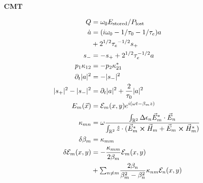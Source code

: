 \documentclass[12pt]{article}
\begin{document}
\begin{multicols}{2}
\textbf{CMT}

\begin{align}
  Q &= \omega_0 E_{\textrm{stored}}/P_{\textrm{lost}}\\
  \dot{a} &= (i\omega_0 - 1/\tau_0 - 1/\tau_e) a\\
  &+ 2^{1/2} {\tau_e}^{-1/2}s_+\\
  s_- &= -s_+ + 2^{1/2} \tau_e^{-1/2} a\\
  p_1 \kappa_{12} &= -p_2 \kappa_{21}^{*}\\
  \partial_t \lvert a \rvert^2 &= - \lvert s_- \rvert^2\\
  \lvert s_+ \rvert^2  - \lvert s_- \rvert^2 &= \partial_t \lvert a \rvert^2 + \frac{2}{\tau_0} \lvert a \rvert^2\\
  E_{m}(\vec{x}) &= \mathcal{E}_m(x, y)e^{i(\omega t - \beta_m z)}\\ %
  \kappa_{mn} &= \omega \frac{\int_{\mathbb{R}^2} \Delta \epsilon_n \vec{E}_m^* \cdot \vec{E}_n}{\int_{\mathbb{R}^2} \hat{z} \cdot (\vec{E}_m^* \cross \vec{H}_m + \vec{E}_m \cross \vec{H}_m^*)}\\
  \delta \beta_{m} &= \kappa_{mm}\\
  \delta \mathcal{E}_m(x, y) &= - \frac{\kappa_{mm}}{2\beta_{m}} \mathcal{E}_m(x, y)\\
         & + {\textstyle \sum_{n \neq m}} \frac{2\beta_n}{\beta_m^2-\beta_n^2}\kappa_{nm} \mathcal{E}_n(x, y) 
\end{align}

\end{multicols}
\end{document}
